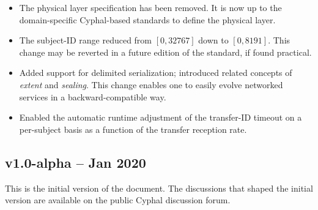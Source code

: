 \begin{itemize}
    \item The physical layer specification has been removed.
    It is now up to the domain-specific Cyphal-based standards to define the physical layer.

    \item The subject-ID range reduced from $[0, 32767]$ down to $[0, 8191]$.
    This change may be reverted in a future edition of the standard, if found practical.

    \item Added support for delimited serialization; introduced related concepts of \emph{extent} and \emph{sealing}.
    This change enables one to easily evolve networked services in a backward-compatible way.

    \item Enabled the automatic runtime adjustment of the transfer-ID timeout on a per-subject basis
    as a function of the transfer reception rate.
\end{itemize}

\subsection{v1.0-alpha -- Jan 2020}

This is the initial version of the document.
The discussions that shaped the initial version are available on the public Cyphal discussion forum.
